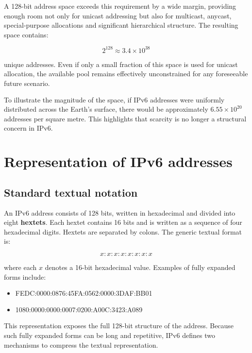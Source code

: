 A 128-bit address space exceeds this requirement by a wide margin, providing enough room not only for unicast addressing but also for multicast, anycast, special-purpose allocations and significant hierarchical structure. The resulting space contains:

\[ 2^{128} \approx 3.4 \times 10^{38} \]

\noindent unique addresses. Even if only a small fraction of this space is used for unicast allocation, the available pool remains effectively unconstrained for any foreseeable future scenario.

To illustrate the magnitude of the space, if IPv6 addresses were uniformly distributed across the Earth's surface, there would be approximately $6.55 \times 10^{20}$ addresses per square metre. This highlights that scarcity is no longer a structural concern in IPv6.

\begin{center}
\end{center}

\section{Representation of IPv6 addresses}

\subsection{Standard textual notation}

An IPv6 address consists of 128 bits, written in hexadecimal and divided into eight \textbf{hextets}. Each hextet contains 16 bits and is written as a sequence of four hexadecimal digits. Hextets are separated by colons. The generic textual format is:

\[ x : x : x : x : x : x : x : x \]

\noindent where each $x$ denotes a 16-bit hexadecimal value. Examples of fully expanded forms include:

\begin{itemize}
\item FEDC:0000:0876:45FA:0562:0000:3DAF:BB01
\item 1080:0000:0000:0007:0200:A00C:3423:A089
\end{itemize}

This representation exposes the full 128-bit structure of the address. Because such fully expanded forms can be long and repetitive, IPv6 defines two mechanisms to compress the textual representation.

